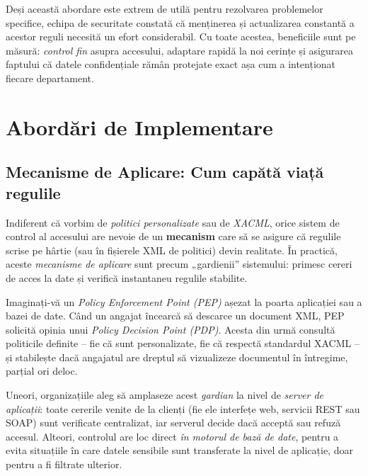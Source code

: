\documentclass[runningheads]{llncs}
\begin{document}
Deși această abordare este extrem de utilă pentru rezolvarea problemelor specifice, echipa de securitate constată că menținerea și actualizarea constantă a acestor reguli necesită un efort considerabil. Cu toate acestea, beneficiile sunt pe măsură: \emph{control fin} asupra accesului, adaptare rapidă la noi cerințe și asigurarea faptului că datele confidențiale rămân protejate exact așa cum a intenționat fiecare departament.

\section{Abordări de Implementare}

\subsection{Mecanisme de Aplicare: Cum capătă viață regulile}
\label{sec:enforcement-mechanisms}

Indiferent că vorbim de \emph{politici personalizate} sau de \emph{XACML}, orice sistem de control al accesului are nevoie de un \textbf{mecanism} care să se asigure că regulile scrise pe hârtie (sau în fișierele XML de politici) devin realitate. În practică, aceste \emph{mecanisme de aplicare} sunt precum „gardienii” sistemului: primesc cereri de acces la date și verifică instantaneu regulile stabilite.

Imaginați-vă un \emph{Policy Enforcement Point (PEP)} așezat la poarta aplicației sau a bazei de date. Când un angajat încearcă să descarce un document XML, PEP solicită opinia unui \emph{Policy Decision Point (PDP)}. Acesta din urmă consultă politicile definite – fie că sunt personalizate, fie că respectă standardul XACML – și stabilește dacă angajatul are dreptul să vizualizeze documentul în întregime, parțial ori deloc.

Uneori, organizațiile aleg să amplaseze acest \emph{gardian} la nivel de \emph{server de aplicații}: toate cererile venite de la clienți (fie ele interfețe web, servicii REST sau SOAP) sunt verificate centralizat, iar serverul decide dacă acceptă sau refuză accesul. Alteori, controlul are loc direct \emph{în motorul de bază de date}, pentru a evita situațiile în care datele sensibile sunt transferate la nivel de aplicație, doar pentru a fi filtrate ulterior.
\end{document}
